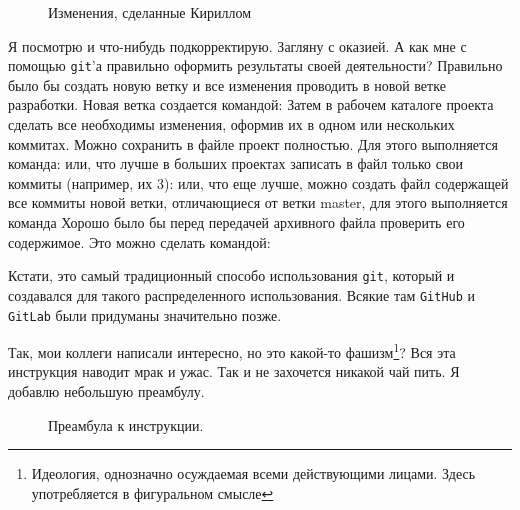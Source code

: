 \documentclass[14pt,a4paper]{article}
\begin{document}
\begin{figure}
	\centering
	\caption{Изменения, сделанные Кириллом}
	\label{pic-diff-result}
\end{figure}

 Я посмотрю и что-нибудь подкорректирую. Загляну с оказией. 
А как мне с помощью \texttt{git}'а правильно оформить результаты своей деятельности?
 Правильно было бы создать новую ветку и все изменения проводить 
в новой ветке разработки. Новая ветка создается командой:
Затем в рабочем каталоге проекта сделать все необходимы изменения, оформив их в одном
или нескольких коммитах. Можно сохранить в файле проект полностью. Для этого выполняется 
команда:
или, что лучше в больших проектах записать в файл только свои коммиты (например, их 3):
или, что еще лучше, можно создать файл содержащей все коммиты новой ветки, отличающиеся от ветки
master, для этого выполняется команда
Хорошо было бы перед передачей архивного файла проверить его содержимое. Это можно сделать 
командой:

Кстати, это самый традиционный способо использования \texttt{git}, который и создавался
для такого распределенного использования. Всякие там \texttt{GitHub} и \texttt{GitLab}
были придуманы значительно позже.

 Так, мои коллеги написали интересно, но это какой-то
фашизм\footnote{Идеология, однозначно осуждаемая всеми действующими лицами. Здесь употребляется в
фигуральном смысле}? Вся эта инструкция наводит мрак и ужас. Так и не захочется никакой чай пить.
Я добавлю небольшую преамбулу.

\begin{figure}
	\centering
	\caption{Преамбула к инструкции.}
	\label{listing-preambula}
\end{figure}


\end{document}

